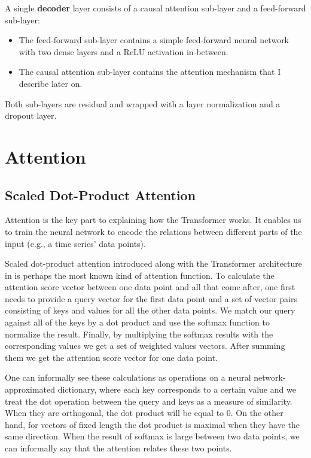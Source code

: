 \documentclass[en]{pracamgr}
\begin{document}
A single \textbf{decoder} layer consists of a causal attention sub-layer and a feed-forward sub-layer:
\begin{itemize}
	\item The feed-forward sub-layer contains a simple feed-forward neural network with two dense layers and a ReLU activation in-between.
	\item The causal attention sub-layer contains the attention mechanism that I describe later on.
\end{itemize}

Both sub-layers are residual and wrapped with a layer normalization and a dropout layer.

\section{Attention}

\subsection{Scaled Dot-Product Attention}

Attention is the key part to explaining how the Transformer works.
It enables us to train the neural network to encode the relations between different parts of the input (e.g., a time series' data points).


%

Scaled dot-product attention introduced along with the Transformer architecture in \cite{tr} is perhaps the most known kind of attention function.
To calculate the attention score vector between one data point and all that come after, one first needs to provide a query vector for the first data point and a set of vector pairs consisting of keys and values for all the other data points. We match our query against all of the keys by a dot product and use the softmax function to normalize the result. Finally, by multiplying the softmax results with the corresponding values we get a set of weighted values vectors. After summing them we get the attention score vector for one data point.

One can informally see these calculations as operations on a neural network-approximated dictionary, where each key corresponds to a certain value and we treat the dot operation between the query and keys as a measure of similarity. When they are orthogonal, the dot product will be equal to 0. On the other hand, for vectors of fixed length the dot product is maximal when they have the same direction. When the result of softmax is large between two data points, we can informally say that the attention relates these two points.
\newline
\end{document}
